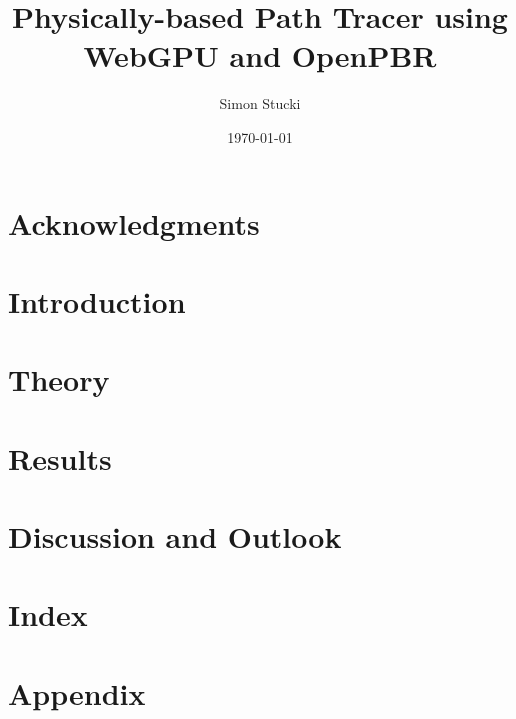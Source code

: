 \documentclass[a4paper, 11pt,abstract=on, listof=totocnumbered]{scrreprt}
\title{Physically-based Path Tracer using WebGPU and OpenPBR}
\author{Simon Stucki}
\date{\today}
\begin{document}
% 

\clearpage
\setcounter{page}{1}


\begin{abstract}

\end{abstract}

\chapter*{Acknowledgments}


\renewcommand{\contentsname}{Contents}
\tableofcontents

\chapter{Introduction}


\chapter{Theory}


\chapter{Results}


\chapter{Discussion and Outlook}


\chapter{Index}


\appendix
\chapter{Appendix}
\label{ch:appendix}
%
\end{document}
